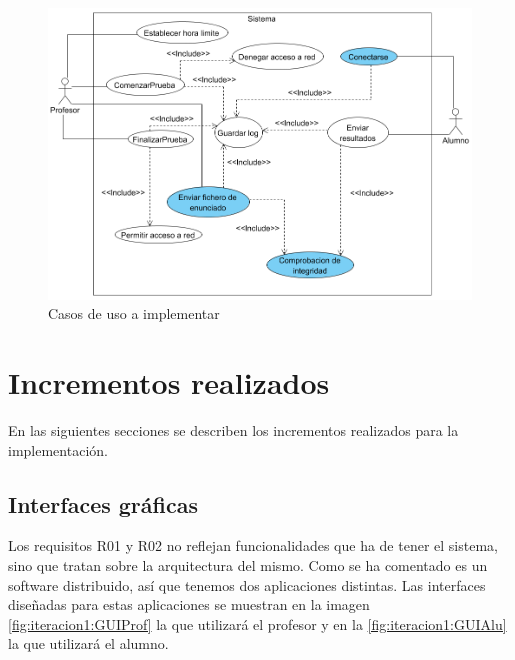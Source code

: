 \begin{figure}[]
    \centering
    \includegraphics[width=.90\linewidth]{iteracion1/casosUso}
    \caption{Casos de uso a implementar}
    \label{fig:iteracion1:casosUso}
\end{figure}


\section{Incrementos realizados}

En las siguientes secciones se describen los incrementos realizados para la implementación.


\subsection{Interfaces gráficas}

Los requisitos R01 y R02 no reflejan funcionalidades que ha de tener el sistema, sino que tratan sobre la arquitectura del mismo. Como se ha comentado es un software distribuido, así que tenemos dos aplicaciones distintas. Las interfaces diseñadas para estas aplicaciones se muestran en la imagen \ref{fig:iteracion1:GUIProf} la que utilizará el profesor y en la \ref{fig:iteracion1:GUIAlu} la que utilizará el alumno.
\newline


